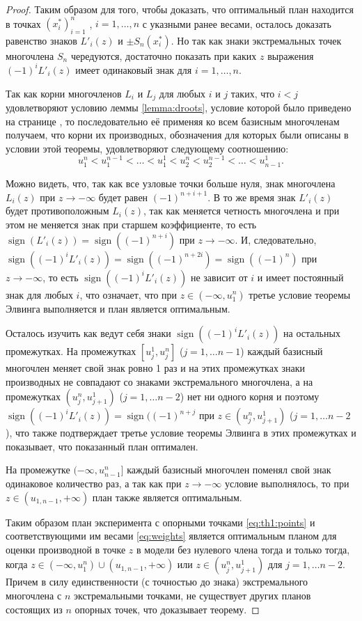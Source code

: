 \documentclass[specialist,
               substylefile = spbu.rtx,
               subf,href,colorlinks=true, 12pt]{disser}
\theoremstyle{definition}
\DeclareMathOperator*{\sign}{sign}
\begin{document}
\begin{proof}
	Таким образом для того, чтобы доказать, что оптимальный план находится в точках $(x_i^*)_{i=1}^n$ , $i = 1, \ldots, n$ с указными ранее весами, осталось доказать равенство знаков $L'_i(z)$ и $\pm S_n(x_i^*)$. Но так как знаки экстремальных точек многочлена $S_n$ чередуются, достаточно показать при каких $z$ выражения $(-1)^i L'_i(z)$ имеет одинаковый знак для $i=1,\ldots , n$.
	
	Так как корни многочленов $L_i$ и $L_j$ для любых $i$ и $j$ таких, что $i < j$ удовлетворяют условию леммы \ref{lemma:droots}, условие которой было приведено на странице \pageref{lemma:droots}, то последовательно её применяя ко всем базисным многочленам получаем, что корни их производных, обозначения для которых были описаны в условии этой теоремы, удовлетворяют следующему соотношению:
	\begin{equation*}
		u^n_1 < u^{n-1}_1 < \ldots < u^1_1 < u^n_2 < u^{n-1}_2 < \ldots < u_{n-1}^1.
	\end{equation*}
	
	Можно видеть, что, так как все узловые точки больше нуля, знак многочлена $L_i(z)$ при $z \to -\infty$ будет равен $(-1)^{n+i+1}$. В то же время знак $L'_i(z)$ будет противоположным $L_i(z)$, так как меняется четность многочлена и при этом не меняется знак при старшем коэффициенте, то есть $\sign(L'_i(z)) = \sign((-1)^{n+i})$ при $z \to -\infty$. И, следовательно, $\sign((-1)^i L'_i(z)) = \sign((-1)^{n+2i}) = \sign((-1)^{n})$ при $z \to -\infty$, то есть $\sign((-1)^i L'_i(z))$ не зависит от $i$ и имеет постоянный знак для любых $i$, что означает, что при $z \in (-\infty, u_1^n)$ третье условие теоремы Элвинга выполняется и план является оптимальным.
	
	Осталось изучить как ведут себя знаки $\sign((-1)^i L'_i(z))$ на остальных промежутках. На промежутках $[u_j^1, u_j^n]$ ($j = 1, \ldots {n-1}$) каждый базисный многочлен меняет свой знак ровно 1 раз и на этих промежутках знаки производных не совпадают со знаками экстремального многочлена, а на промежутках $(u_j^n, u_{j+1}^1)$ ($j=1, \ldots n-2$) нет ни одного корня и поэтому $\sign((-1)^i L'_i(z)) = \sign ((-1)^{n + j}$ при $z \in (u_j^n, u_{j+1}^1)$ ($j=1, \ldots n-2$), что также подтверждает третье условие теоремы Элвинга в этих промежутках и показывает, что показанный план оптимален.
	
	На промежутке $(-\infty, u_{n-1}^n]$ каждый базисный многочлен поменял свой знак одинаковое количество раз, а так как при $z \to -\infty$ условие выполнялось, то при $z \in (u_{1, n-1}, +\infty)$ план также является оптимальным.
	
	Таким образом план эксперимента с опорными точками \eqref{eq:th1:points} и соответствующими им весами \eqref{eq:weights} является оптимальным планом для оценки производной в точке $z$ в модели без нулевого члена тогда и только тогда, когда $z \in  (-\infty, u_1^n) \cup (u_{1, n-1}, +\infty)$ или $z \in (u_j^n, u_{j+1}^1)$ для $j=1, \ldots n-2$. Причем в силу единственности (с точностью до знака) экстремального многочлена с $n$ экстремальными точками, не существует других планов состоящих из $n$ опорных точек, что доказывает теорему.

	\end{proof}
	
\end{document}
